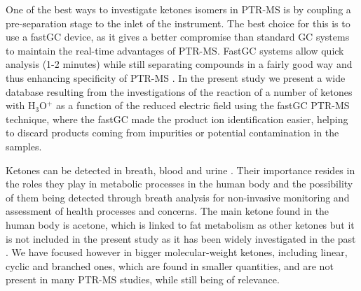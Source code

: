 One of the best ways to investigate ketones isomers in PTR-MS is by coupling a pre-separation stage to the inlet of the instrument. The best choice for this is to use a fastGC device, as it gives a better compromise than standard GC systems to maintain the real-time advantages of PTR-MS. 
FastGC systems  allow quick analysis (1-2 minutes) while still separating compounds in a fairly good way and thus enhancing specificity of PTR-MS \cite{ruzsanyi2013multi,romano2014wine,anderson2015measuring}.
In the present study we present a wide database resulting from the investigations of the reaction  of a number of ketones with H$_3$O$^+$ as a function of the reduced electric field using the fastGC PTR-MS technique, where the fastGC made the product ion identification easier, helping to discard products coming from impurities or potential contamination in the samples.

Ketones can be detected in breath, blood and urine \cite{de2014review}. Their importance resides in the roles they play in metabolic processes in the human body and the possibility of them being detected  through breath analysis for non-invasive monitoring and assessment of health processes and concerns. 
The main ketone found in the human body is acetone, which is linked to fat metabolism as other ketones
but  it is not included in the present study as it has been widely investigated in the past \cite{anderson2015measuring}. We have focused however in bigger molecular-weight ketones, including linear, cyclic and branched ones, which are found in smaller quantities, and are not present in many PTR-MS studies, while still being of relevance.


